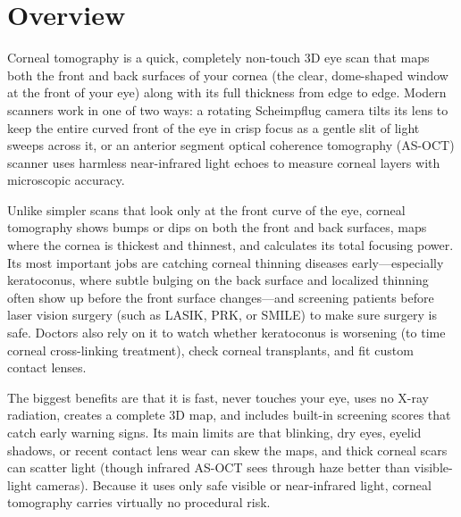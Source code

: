 \label{ch:infographic-corneal-tomography}

\section{Overview}

Corneal tomography is a quick, completely non-touch 3D eye scan that maps both the front and back surfaces of your cornea (the clear, dome-shaped window at the front of your eye) along with its full thickness from edge to edge. Modern scanners work in one of two ways: a rotating Scheimpflug camera tilts its lens to keep the entire curved front of the eye in crisp focus as a gentle slit of light sweeps across it, or an anterior segment optical coherence tomography (AS-OCT) scanner uses harmless near-infrared light echoes to measure corneal layers with microscopic accuracy.

Unlike simpler scans that look only at the front curve of the eye, corneal tomography shows bumps or dips on both the front and back surfaces, maps where the cornea is thickest and thinnest, and calculates its total focusing power. Its most important jobs are catching corneal thinning diseases early---especially keratoconus, where subtle bulging on the back surface and localized thinning often show up before the front surface changes---and screening patients before laser vision surgery (such as LASIK, PRK, or SMILE) to make sure surgery is safe. Doctors also rely on it to watch whether keratoconus is worsening (to time corneal cross-linking treatment), check corneal transplants, and fit custom contact lenses.

The biggest benefits are that it is fast, never touches your eye, uses no X-ray radiation, creates a complete 3D map, and includes built-in screening scores that catch early warning signs. Its main limits are that blinking, dry eyes, eyelid shadows, or recent contact lens wear can skew the maps, and thick corneal scars can scatter light (though infrared AS-OCT sees through haze better than visible-light cameras). Because it uses only safe visible or near-infrared light, corneal tomography carries virtually no procedural risk.

